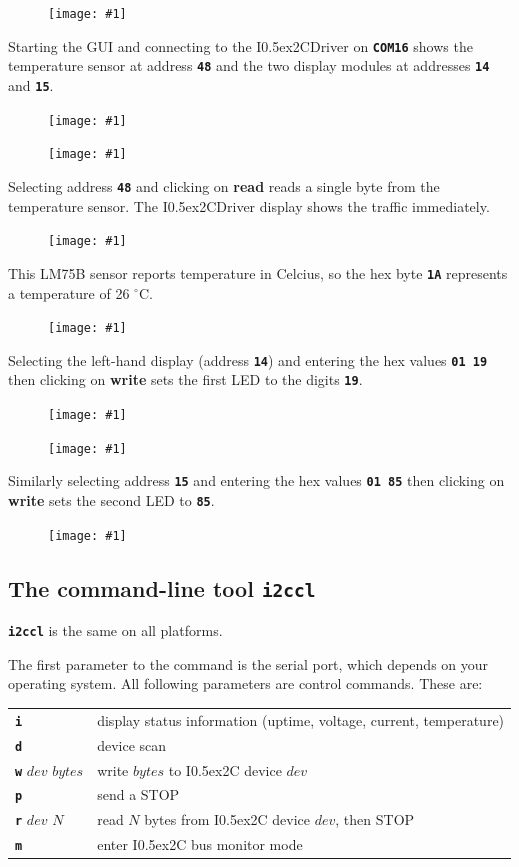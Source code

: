\documentclass{article}
\newcommand{\two}{\raise0.5ex\hbox{\footnotesize{2}}}
\newcommand{\iic}{I\two{}C}
\newcommand{\iicdriver}{I\two{}CDriver}
\newcommand{\degc}{$^{\circ}$C}
\newcommand{\png}[1]{
\begin{figure}[H]
\begin{center}
\texttt{[image: \#1]}
\end{center}
\end{figure}
}
\newcommand{\pngw}[2]{
\begin{figure}[H]
\begin{center}
\texttt{[image: \#1]}
\end{center}
\end{figure}
}
\newcommand{\mach}[1]{\texttt{\textbf{#1}}}
\newcommand{\gap}{\vspace{10pt}}
\begin{document}
\png{img/i2cdriver/DSC_6031.JPG}

Starting the GUI and connecting to the \iicdriver{} on \mach{COM16}
shows the temperature sensor at address \mach{48}
and the two display modules at addresses \mach{14} and \mach{15}.

\pngw{img/i2cdriver/ss-0}{0.65}

\png{img/i2cdriver/ss-1}

Selecting address \mach{48} and clicking on \textbf{read}
reads a single byte from the temperature sensor.
The \iicdriver{} display shows the traffic immediately.

\png{img/i2cdriver/DSC_6032.JPG}

This LM75B sensor reports temperature in Celcius, so the hex byte \mach{1A} represents a temperature of 26 \degc.

\newpage
\png{img/i2cdriver/ss-3}

Selecting the left-hand display (address \mach{14}) and entering the hex values \mach{01 19}
then clicking on \textbf{write} sets the first LED to the digits \mach{19}.

\png{img/i2cdriver/DSC_6033.JPG}

\png{img/i2cdriver/ss-4}

Similarly selecting address \mach{15} and entering the hex values \mach{01 85}
then clicking on \textbf{write} sets the second LED to \mach{85}.

\png{img/i2cdriver/DSC_6034.JPG}

\newpage
\subsection{The command-line tool \mach{i2ccl}}

\mach{i2ccl} is the same on all platforms.

The first parameter to the command is the serial port, which depends on your operating system.
All following parameters are control commands. These are:

\begin{tabular}{ll}
  \mach{i}               & display status information (uptime, voltage, current, temperature) \\
  \mach{d}               & device scan \index{bus scan} \\
  \mach{w} $dev$ $bytes$ & write $bytes$ to \iic{} device $dev$ \\
  \mach{p}               & send a STOP \\
  \mach{r} $dev$ $N$     & read $N$ bytes from \iic{} device $dev$, then STOP \\
  \mach{m}               & enter \iic{} bus monitor mode \\
\end{tabular}\gap
\end{document}
